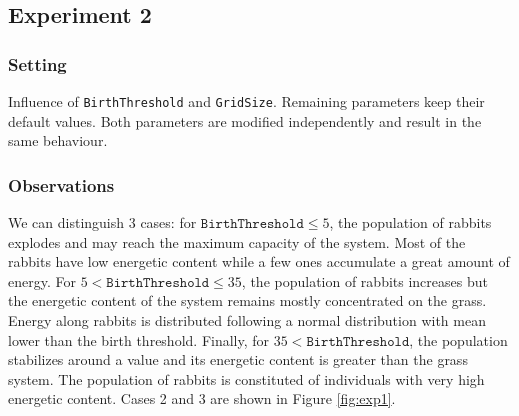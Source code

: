 \documentclass[11pt]{article}
\begin{document}
\subsection{Experiment 2}
\subsubsection{Setting}
Influence of \texttt{BirthThreshold} and \texttt{GridSize}. Remaining parameters keep their default values. Both parameters are modified independently and result in the same behaviour.

\subsubsection{Observations}
We can distinguish 3 cases: for $\texttt{BirthThreshold} \leq 5$, the population of rabbits explodes and may reach the maximum capacity of the system. Most of the rabbits have low energetic content while a few ones accumulate a great amount of energy. For $5 < \texttt{BirthThreshold} \leq 35$, the population of rabbits increases but the energetic content of the system remains mostly concentrated on the grass. Energy along rabbits is distributed following a normal distribution with mean lower than the birth threshold. Finally, for $35 < \texttt{BirthThreshold}$, the population stabilizes around a value and its energetic content is greater than the grass system. The population of rabbits is constituted of individuals with very high energetic content. Cases 2 and 3 are shown in Figure \ref{fig:exp1}.
\end{document}
